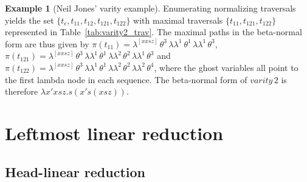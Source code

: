 \documentclass{elsarticle}
\theoremstyle{plain}
\theoremstyle{definition}
\newtheorem{example}{Example}[section]
\newcommand{\ghostlmd}{{\lambda\!\!\lambda}}
\newcommand{\ghostvar}{\theta}
\def\coresymbol{\pi} %
\newcommand{\core}[1]{\coresymbol(#1)} %
\begin{document}
\begin{example}[Neil Jones' varity example]
Enumerating normalizing traversals yields the set $\{t_\epsilon, t_{11}, t_{12}, t_{121}, t_{122} \}$ with maximal traversals $\{ t_{11}, t_{121}, t_{122} \}$ represented in Table~\ref{tab:varity2_trav}.
The maximal paths in the beta-normal form are thus given by
$\core{t_{11}} =
        \lambda^{[x x s z]} \,\ghostvar^{3}\,\ghostlmd^{1}\
        \ghostvar^{1}\,\ghostlmd^{1}\,\ghostvar^{3}
$,
$\core{t_{121}} =
        \lambda^{[x x s z]} \,\ghostvar^{3}\,\ghostlmd^{1}\,\ghostvar^{1}\,\ghostlmd^{2}\,\ghostvar^{2}\,\ghostlmd^{1}\,\ghostvar^{3}$
and
$\core{t_{122}} =
    \lambda^{[x x s z]} \,\ghostvar^{3}\,\ghostlmd^{1}\,\ghostvar^{1}\,\ghostlmd^{2}\,\ghostvar^{2}\,\ghostlmd^{2}\,\ghostvar^{4}$,
where the ghost variables all point to the first lambda node in each sequence.
The beta-normal form of $varity\, 2$ is therefore $\lambda x' x s z . s (x' s (x s z))$.
\end{example}


\section{Leftmost linear reduction}
\label{sec:leftmostlinearred}


\subsection{Head-linear reduction}
\end{document}
